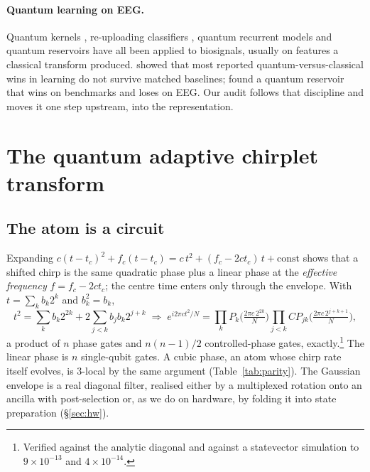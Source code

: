 \documentclass{article}
\begin{document}
\paragraph{Quantum learning on EEG.} Quantum kernels \citep{havlicek2019supervised,huang2021power}, re-uploading classifiers \citep{perez2020reuploading}, quantum recurrent models \citep{chen2020qlstm} and quantum reservoirs \citep{fujii2017harnessing,martinez2021dynamical} have all been applied to biosignals, usually on features a classical transform produced. \citet{bowles2024better} showed that most reported quantum-versus-classical wins in learning do not survive matched baselines; \citet{wolff2026qrc} found a quantum reservoir that wins on benchmarks and loses on EEG. Our audit follows that discipline and moves it one step upstream, into the representation.

\section{The quantum adaptive chirplet transform}
\label{sec:qact}
\subsection{The atom is a circuit}
Expanding $c(t-t_c)^2+f_c(t-t_c)=c\,t^2+(f_c-2ct_c)\,t+\text{const}$ shows that a shifted chirp is the same quadratic phase plus a linear phase at the \emph{effective frequency} $f=f_c-2ct_c$; the centre time enters only through the envelope. With $t=\sum_k b_k2^k$ and $b_k^2=b_k$,
\begin{equation}
t^2=\sum_k b_k 2^{2k}+2\sum_{j<k}b_jb_k2^{j+k}
\;\Rightarrow\;
e^{i2\pi ct^2/N}=\prod_k P_k\!\big(\tfrac{2\pi c\,2^{2k}}{N}\big)\prod_{j<k}CP_{jk}\!\big(\tfrac{2\pi c\,2^{j+k+1}}{N}\big),
\label{eq:twolocal}
\end{equation}
a product of $n$ phase gates and $n(n-1)/2$ controlled-phase gates, exactly.\footnote{Verified against the analytic diagonal and against a statevector simulation \citep{qiskit2024} to $9\times10^{-13}$ and $4\times10^{-14}$.} The linear phase is $n$ single-qubit gates. A cubic phase, an atom whose chirp rate itself evolves, is 3-local by the same argument (Table~\ref{tab:parity}). The Gaussian envelope is a real diagonal filter, realised either by a multiplexed rotation onto an ancilla with post-selection or, as we do on hardware, by folding it into state preparation (\S\ref{sec:hw}).
\end{document}
